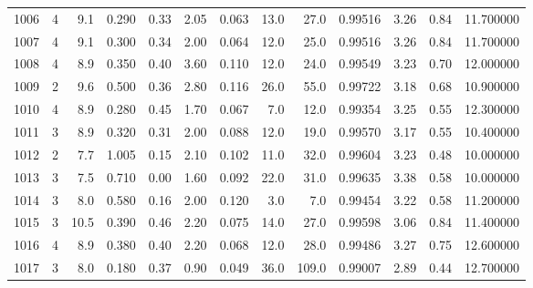 \begin{tabular}{lrrrrrrrrrrrr}
1006 &        4 &            9.1 &             0.290 &         0.33 &            2.05 &      0.063 &                 13.0 &                  27.0 &  0.99516 &  3.26 &       0.84 &  11.700000 \\
1007 &        4 &            9.1 &             0.300 &         0.34 &            2.00 &      0.064 &                 12.0 &                  25.0 &  0.99516 &  3.26 &       0.84 &  11.700000 \\
1008 &        4 &            8.9 &             0.350 &         0.40 &            3.60 &      0.110 &                 12.0 &                  24.0 &  0.99549 &  3.23 &       0.70 &  12.000000 \\
1009 &        2 &            9.6 &             0.500 &         0.36 &            2.80 &      0.116 &                 26.0 &                  55.0 &  0.99722 &  3.18 &       0.68 &  10.900000 \\
1010 &        4 &            8.9 &             0.280 &         0.45 &            1.70 &      0.067 &                  7.0 &                  12.0 &  0.99354 &  3.25 &       0.55 &  12.300000 \\
1011 &        3 &            8.9 &             0.320 &         0.31 &            2.00 &      0.088 &                 12.0 &                  19.0 &  0.99570 &  3.17 &       0.55 &  10.400000 \\
1012 &        2 &            7.7 &             1.005 &         0.15 &            2.10 &      0.102 &                 11.0 &                  32.0 &  0.99604 &  3.23 &       0.48 &  10.000000 \\
1013 &        3 &            7.5 &             0.710 &         0.00 &            1.60 &      0.092 &                 22.0 &                  31.0 &  0.99635 &  3.38 &       0.58 &  10.000000 \\
1014 &        3 &            8.0 &             0.580 &         0.16 &            2.00 &      0.120 &                  3.0 &                   7.0 &  0.99454 &  3.22 &       0.58 &  11.200000 \\
1015 &        3 &           10.5 &             0.390 &         0.46 &            2.20 &      0.075 &                 14.0 &                  27.0 &  0.99598 &  3.06 &       0.84 &  11.400000 \\
1016 &        4 &            8.9 &             0.380 &         0.40 &            2.20 &      0.068 &                 12.0 &                  28.0 &  0.99486 &  3.27 &       0.75 &  12.600000 \\
1017 &        3 &            8.0 &             0.180 &         0.37 &            0.90 &      0.049 &                 36.0 &                 109.0 &  0.99007 &  2.89 &       0.44 &  12.700000 \\

\end{tabular}
